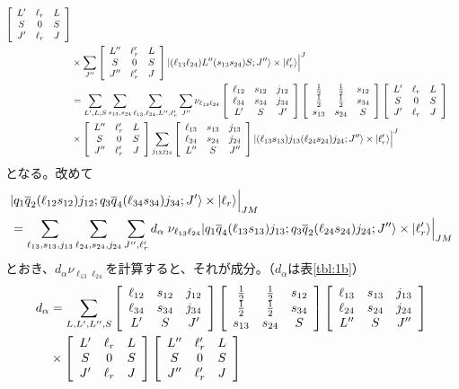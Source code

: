 \documentclass[a4j]{jarticle}
\def\ket{\rangle}
\def\Jpsi{{J\!/\!\psi}{}}
\def\cbar{\overline{{c}}}
\def\qbar{\overline{{q}}}
\def\Dbar{\overline{{D}}{}}
\def\half#1{\text{${#1\over 2}$}}
\newcommand{\U}[9]{\left[\begin{array}{ccc}#1&#2&#3\\#4&#5&#6\\#7&#8&#9\\ \end{array}\right]}
\begin{document}
\begin{align}
\U{L'}{\ell_r}{L}{S}{0}{S}{J'}{\ell_r}{J}
\nonumber\\
&
\times
\sum_{J''}
\U{L''}{\ell_r'}{L}{S}{0}{S}{J''}{\ell_r'}{J}
|(\ell_{13}\ell_{24})L''(s_{13}s_{24})S;J''\ket\times|\ell_r'\ket\Big|^J
\\
&=
\sum_{L',L,S}
\sum_{s_{13},s_{24}}
\sum_{\ell_{13},\ell_{24},L'',\ell_r'}
\sum_{J''}
\nu_{\ell_{13}\ell_{24}}
\U{\ell_{12}}{s_{12}}{j_{12}}{\ell_{34}}{s_{34}}{j_{34}}{L'}{S}{J'}
\U{\half1}{\half1}{s_{12}}{\half1}{\half1}{s_{34}}{s_{13}}{s_{24}}{S}
\U{L'}{\ell_r}{L}{S}{0}{S}{J'}{\ell_r}{J}
\nonumber\\
&\times
\U{L''}{\ell_r'}{L}{S}{0}{S}{J''}{\ell_r'}{J}
\sum_{j_{13}j_{24}}
\U{\ell_{13}}{s_{13}}{j_{13}}{\ell_{24}}{s_{24}}{j_{24}}{L''}{S}{J''}
|(\ell_{13}s_{13})j_{13}(\ell_{24}s_{24})j_{24};J''\ket\times|\ell_r'\ket\Big|^J
\end{align}
となる。改めて
\begin{align}
\lefteqn{|q_1\qbar_2  (\ell_{12}s_{12})j_{12};q_3\qbar_4 (\ell_{34}s_{34})j_{34};J'\ket \times|\ell_r\ket \Big|_{JM}}&\nonumber\\
&=
\sum_{\ell_{13},s_{13},j_{13}}
\sum_{\ell_{24},s_{24},j_{24}}
\sum_{J'',\ell_r'}
d_\alpha\; \nu_{\ell_{13}\ell_{24}}
|q_1\qbar_4 (\ell_{13}s_{13})j_{13};q_3\qbar_2  (\ell_{24}s_{24})j_{24};J''\ket\times|\ell_r'\ket\Big|_{JM}
\end{align}
とおき、$d_\alpha \nu_{\ell_{13}\ell_{24}}$を計算すると、それが成分。（$d_\alpha$は表\ref{tbl:1b}）
\begin{align}
d_\alpha&=
\sum_{L,L',L'',S}
\U{\ell_{12}}{s_{12}}{j_{12}}{\ell_{34}}{s_{34}}{j_{34}}{L'}{S}{J'}
\U{\half1}{\half1}{s_{12}}{\half1}{\half1}{s_{34}}{s_{13}}{s_{24}}{S}
\U{\ell_{13}}{s_{13}}{j_{13}}{\ell_{24}}{s_{24}}{j_{24}}{L''}{S}{J''}
\nonumber\\
&\times
\U{L'}{\ell_r}{L}{S}{0}{S}{J'}{\ell_r}{J}
\U{L''}{\ell_r'}{L}{S}{0}{S}{J''}{\ell_r'}{J}
\end{align}

\end{document}
